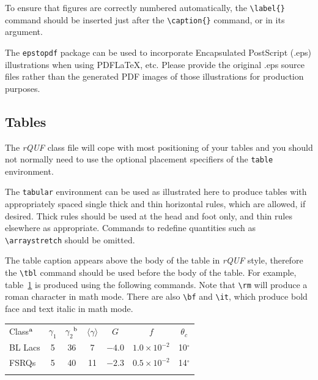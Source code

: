 \documentclass{rQUF2e}
\theoremstyle{plain}
\theoremstyle{definition}
\theoremstyle{remark}
\begin{document}
To ensure that figures are correctly numbered automatically, the \verb"\label{}" command should be inserted just
after the \verb"\caption{}" command, or in its argument.

The \texttt{epstopdf} package can be used to incorporate Encapsulated PostScript (.eps) illustrations when using PDF\LaTeX, etc. 
Please provide the original .eps source files rather than the generated PDF images of those illustrations for production purposes.


\subsection{Tables}

The \textit{rQUF} class file will cope with most positioning of your tables and you should not normally need to use the optional
placement specifiers of the \texttt{table} environment.

The \texttt{tabular} environment can be used as illustrated here to produce tables with appropriately spaced single thick and thin
horizontal rules, which are allowed, if desired. Thick rules should be used at the head and foot only, and thin rules elsewhere as appropriate.
Commands to redefine quantities such as \verb"\arraystretch" should be omitted.

The table caption appears above the body of the table in \textit{rQUF} style, therefore the \verb"\tbl" command should be used before the body of the table.
For example, table~\ref{sample-table} is produced using the following commands. Note that \verb"\rm" will produce a roman character in math mode.
There are also \verb"\bf" and \verb"\it", which produce bold face and text italic in math mode.

\begin{table}
\begin{center}
\begin{minipage}{80mm}
{\begin{tabular}{@{}lcccccc}\toprule
  Class$^{\rm a}$ & $\gamma _1$ & $\gamma _2$$^{\rm b}$
         & $\langle \gamma \rangle$
         & $G$ & $f$ & $\theta _{c}$ \\
\colrule
  BL Lacs & 5 & 36 & 7 & $-4.0$ & $1.0\times 10^{-2}$ & 10$^\circ$ \\
  FSRQs & 5 & 40 & 11 & $-2.3$ & $0.5\times 10^{-2}$ & 14$^\circ$ \\
\botrule
\end{tabular}}
\label{sample-table}
\end{minipage}
\end{center}
\end{table}
\end{document}
